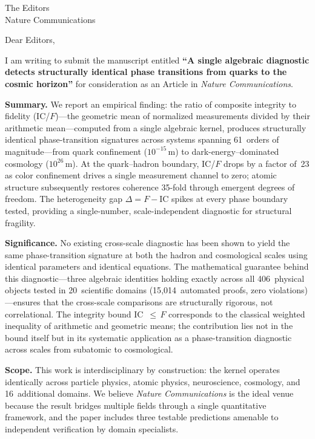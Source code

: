 \documentclass[11pt]{letter}
\begin{document}
\begin{letter}{The Editors\\Nature Communications}

\opening{Dear Editors,}

I am writing to submit the manuscript entitled \textbf{``A single
algebraic diagnostic detects structurally identical phase transitions
from quarks to the cosmic horizon''} for consideration as an Article
in \emph{Nature Communications}.

\textbf{Summary.} We report an empirical finding: the ratio of
composite integrity to fidelity (IC/$F$)---the geometric mean of
normalized measurements divided by their arithmetic mean---computed
from a single algebraic kernel, produces structurally identical
phase-transition signatures across
systems spanning 61~orders of magnitude---from quark confinement
($10^{-15}$\,m) to dark-energy--dominated cosmology ($10^{26}$\,m).
At the quark--hadron boundary, IC/$F$ drops by a factor of~23 as
color confinement drives a single measurement channel to zero;
atomic structure subsequently restores coherence 35-fold through
emergent degrees of freedom. The heterogeneity gap
$\Delta = F - \text{IC}$ spikes at every phase boundary tested,
providing a single-number, scale-independent diagnostic for
structural fragility.

\textbf{Significance.} No existing cross-scale diagnostic has been
shown to yield the same phase-transition signature at both the hadron
and cosmological scales using identical parameters and identical
equations. The mathematical guarantee behind this diagnostic---three
algebraic identities holding exactly across all 406~physical objects
tested in 20~scientific domains (15{,}014~automated proofs, zero
violations)---ensures that the cross-scale comparisons are
structurally rigorous, not correlational. The integrity bound
IC~$\leq\,F$ corresponds to the classical weighted inequality of
arithmetic and geometric means; the contribution lies not in the
bound itself but in its systematic application as a
phase-transition diagnostic across scales from subatomic to
cosmological.

\textbf{Scope.} This work is interdisciplinary by construction:
the kernel operates identically across particle physics, atomic
physics, neuroscience, cosmology, and 16~additional domains.
We believe \emph{Nature Communications} is the ideal venue because
the result bridges multiple fields through a single quantitative
framework, and the paper includes three testable predictions
amenable to independent verification by domain specialists.


\end{letter}
\end{document}
